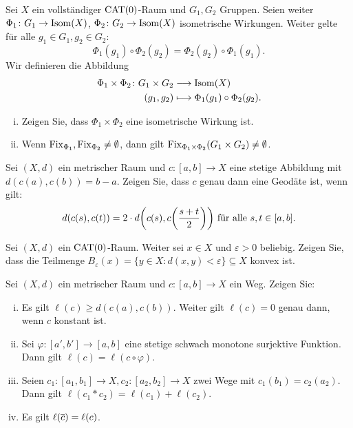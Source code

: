 	\begin{aufgabe}
		\label{aufg:3.3}	
		Sei $X$ ein vollständiger $\operatorname{CAT(0)}$-Raum und $G_1, G_2$ Gruppen. 
		Seien weiter $\Phi_1\colon G_1 \rightarrow \operatorname{Isom}(X)$, $\Phi_2\colon G_2 \rightarrow \operatorname{Isom}(X)$ isometrische Wirkungen.
		Weiter gelte für alle $g_1 \in G_1, g_2 \in G_2$:
		\[
			\Phi_1(g_1) \circ \Phi_2(g_2) = \Phi_2(g_2) \circ \Phi_1(g_1).
		\]
		Wir definieren die Abbildung
		\begin{align*}
			\Phi_1 \times \Phi_2 \colon G_1 \times G_2 &\longrightarrow \operatorname{Isom}(X) \\
			(g_1,g_2) &\longmapsto \Phi_1(g_1) \circ \Phi_2(g_2).
		\end{align*}
		\begin{enumerate}[(i)]
			\item Zeigen Sie, dass $\Phi_1 \times \Phi_2$ eine isometrische Wirkung ist.
			\item Wenn $\operatorname{Fix}_{\Phi_1}, \operatorname{Fix}_{\Phi_2} \neq \emptyset$, dann gilt $\operatorname{Fix}_{\Phi_1 \times \Phi_2}(G_1 \times G_2) \neq \emptyset$.
		\end{enumerate}
	\end{aufgabe}
	
	\begin{aufgabe}
		\label{aufg:3.4}
		Sei $(X,d)$ ein metrischer Raum und $c \colon [a,b] \rightarrow X$ eine stetige Abbildung mit $d(c(a),c(b)) = b-a$.
		Zeigen Sie, dass $c$ genau dann eine Geodäte ist, wenn gilt:
		\[
			d(c(s),c(t)) = 2 \cdot d\enbrace*{c(s),c \enbrace*{\frac{s+t}{2}}} \text{ für alle } s,t \in [a,b].
		\]
	\end{aufgabe}
	
	\begin{aufgabe}
		\label{aufg:4.1}	
		Sei $(X,d)$ ein $\operatorname{CAT(0)}$-Raum.
		Weiter sei $x \in X$ und $\varepsilon > 0$ beliebig.
		Zeigen Sie, dass die Teilmenge $B_\varepsilon(x) = \{y \in X : d(x,y) < \varepsilon\} \subseteq X$ konvex ist.
	\end{aufgabe}
	
	\begin{aufgabe}
		\label{aufg:4.2}	
		Sei $(X,d)$ ein metrischer Raum und $c \colon [a,b] \rightarrow X$ ein Weg.
		Zeigen Sie:
		\begin{enumerate}[(i)]
			\item Es gilt $\ell(c) \geq d(c(a),c(b))$.
			Weiter gilt $\ell(c) = 0$ genau dann, wenn $c$ konstant ist.
			\item Sei $\varphi\colon [a',b'] \rightarrow [a,b]$ eine stetige schwach monotone surjektive Funktion.
			Dann gilt $\ell(c) = \ell(c \circ \varphi)$.
			\item Seien $c_1\colon [a_1,b_1] \rightarrow X, c_2\colon [a_2,b_2] \rightarrow X$ zwei Wege mit $c_1(b_1) = c_2(a_2)$.
			Dann gilt $\ell(c_1 * c_2) = \ell(c_1) + \ell(c_2)$.
			\item Es gilt $\ell(\overline{c}) = \ell(c)$.
		\end{enumerate}
	\end{aufgabe}
	
